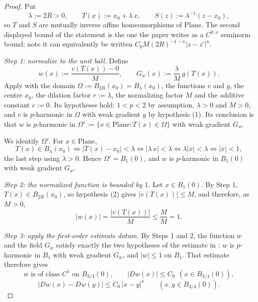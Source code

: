 \begin{proof}
Put
\[
  \lambda:=2R>0,\qquad T(x):=x_0+\lambda\,x,\qquad S(z):=\lambda^{-1}(z-x_0),
\]
so $T$ and $S$ are mutually inverse affine homeomorphisms of $\mathrm{Plane}$.  The second
displayed bound of the statement is the one the paper writes as a $C^{0,\kappa}$ seminorm bound;
note it can equivalently be written $C_0M(2R)^{-1-\kappa}\lvert z-z'\rvert^{\kappa}$.

\medskip\noindent\emph{Step 1: normalize to the unit ball.}
Define
\[
  w(x):=\frac{v(T(x))-0}{M},\qquad G_w(x):=\frac{\lambda}{M}\,g(T(x)).
\]
Apply  with the domain $\Omega:=B_{2R}(x_0)=B_\lambda(x_0)$, the
functions $v$ and $g$, the centre $x_0$, the dilation factor $r:=\lambda$, the normalizing
factor $M$ and the additive constant $c:=0$.  Its hypotheses hold: $1<p<2$ by assumption,
$\lambda>0$ and $M>0$, and $v$ is $p$-harmonic in $\Omega$ with weak gradient $g$ by hypothesis
(1).  Its conclusion is that $w$ is $p$-harmonic in
$\Omega':=\{x\in\mathrm{Plane}:T(x)\in\Omega\}$ with weak gradient $G_w$.

We identify $\Omega'$.  For $x\in\mathrm{Plane}$,
\[
  T(x)\in B_\lambda(x_0)
  \iff \lvert T(x)-x_0\rvert<\lambda
  \iff \lvert\lambda\,x\rvert<\lambda
  \iff \lambda\lvert x\rvert<\lambda
  \iff \lvert x\rvert<1,
\]
the last step using $\lambda>0$.  Hence $\Omega'=B_1(0)$, and $w$ is $p$-harmonic in $B_1(0)$
with weak gradient $G_w$.

\medskip\noindent\emph{Step 2: the normalized function is bounded by $1$.}
Let $x\in B_1(0)$.  By Step 1, $T(x)\in B_{2R}(x_0)$, so hypothesis (2) gives
$\lvert v(T(x))\rvert\le M$, and therefore, as $M>0$,
\[
  \lvert w(x)\rvert=\frac{\lvert v(T(x))\rvert}{M}\le\frac{M}{M}=1 .
\]

\medskip\noindent\emph{Step 3: apply the first-order estimate datum.}
By Steps 1 and 2, the function $w$ and the field $G_w$ satisfy exactly the two hypotheses of the
estimate in : $w$ is $p$-harmonic in $B_1$ with weak gradient
$G_w$, and $\lvert w\rvert\le1$ on $B_1$.  That estimate therefore gives
\begin{equation}\label{eq:pje-w}
  w\text{ is of class }C^{1}\text{ on }B_{3/4}(0),\qquad
  \lvert Dw(x)\rvert\le C_0\ \ (x\in B_{3/4}(0)),
\end{equation}
\begin{equation}\label{eq:pje-whol}
  \lvert Dw(x)-Dw(y)\rvert\le C_0\,\lvert x-y\rvert^{\kappa}\qquad(x,y\in B_{3/4}(0)).
\end{equation}


\end{proof}
